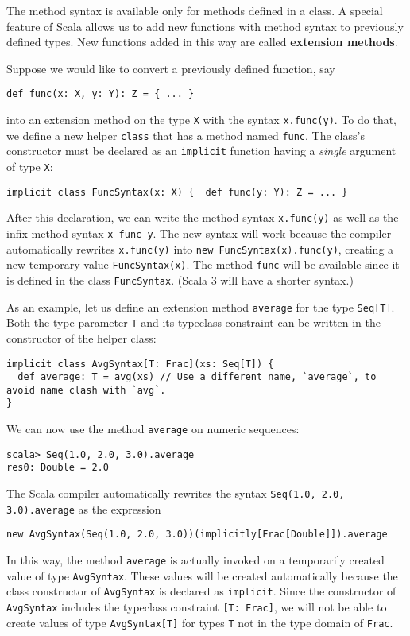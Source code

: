 The method syntax is available only for methods defined in a class.
A special feature of Scala allows us to add new functions with method
syntax to previously defined types. New functions added in this way
are called \textbf{extension methods}. 

Suppose we would like to convert a previously defined function, say
\begin{lstlisting}
def func(x: X, y: Y): Z = { ... }
\end{lstlisting}
into an extension method on the type \lstinline!X! with the syntax
\lstinline!x.func(y)!. To do that, we define a new helper \lstinline!class!
that has a method named \lstinline!func!. The class\textsf{'}s constructor
must be declared as an \lstinline!implicit! function having a \emph{single}
argument of type \lstinline!X!:
\begin{lstlisting}
implicit class FuncSyntax(x: X) {  def func(y: Y): Z = ... }
\end{lstlisting}
After this declaration, we can write the method syntax \lstinline!x.func(y)!
as well as the infix method syntax \lstinline!x func y!. The new
syntax will work because the compiler automatically rewrites \lstinline!x.func(y)!
into \lstinline!new FuncSyntax(x).func(y)!, creating a new temporary
value \lstinline!FuncSyntax(x)!. The method \lstinline!func! will
be available since it is defined in the class \lstinline!FuncSyntax!.
(Scala 3 will have a shorter syntax.)

As an example, let us define an extension method \lstinline!average!
for the type \lstinline!Seq[T]!. Both the type parameter \lstinline!T!
and its typeclass constraint can be written in the constructor of
the helper class:
\begin{lstlisting}
implicit class AvgSyntax[T: Frac](xs: Seq[T]) {
  def average: T = avg(xs) // Use a different name, `average`, to avoid name clash with `avg`.
}
\end{lstlisting}
We can now use the method \lstinline!average! on numeric sequences:
\begin{lstlisting}
scala> Seq(1.0, 2.0, 3.0).average
res0: Double = 2.0
\end{lstlisting}
The Scala compiler automatically rewrites the syntax \lstinline!Seq(1.0, 2.0, 3.0).average!
as the expression
\begin{lstlisting}
new AvgSyntax(Seq(1.0, 2.0, 3.0))(implicitly[Frac[Double]]).average
\end{lstlisting}
In this way, the method \lstinline!average! is actually invoked on
a temporarily created value of type \lstinline!AvgSyntax!. These
values will be created automatically because the class constructor
of \lstinline!AvgSyntax! is declared as \lstinline!implicit!. Since
the constructor of \lstinline!AvgSyntax! includes the typeclass constraint
\lstinline![T: Frac]!, we will not be able to create values of type
\lstinline!AvgSyntax[T]! for types \lstinline!T! not in the type
domain of \lstinline!Frac!.

